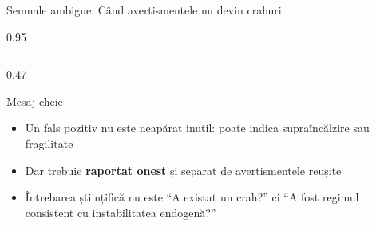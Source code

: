 \documentclass[9pt, aspectratio=169, t]{beamer}
\begin{document}
\begin{frame}{Semnale ambigue: Când avertismentele nu devin crahuri}
\begin{cminipage}{0.95\textwidth}
{\begin{columns}[T]
\begin{column}{0.47\textwidth}
\begin{exampleblock}{Mesaj cheie}
                \begin{itemize}\setlength{\itemsep}{0pt}
                    \item Un fals pozitiv nu este neapărat inutil: poate indica supraîncălzire sau fragilitate
                    \item Dar trebuie \textbf{raportat onest} și separat de avertismentele reușite
                    \item Întrebarea științifică nu este ``A existat un crah?'' ci ``A fost regimul consistent cu instabilitatea endogenă?''
                \end{itemize}
            \end{exampleblock}
        \end{column}
    \end{columns}
    }
    \end{cminipage}
\end{frame}
\end{document}
